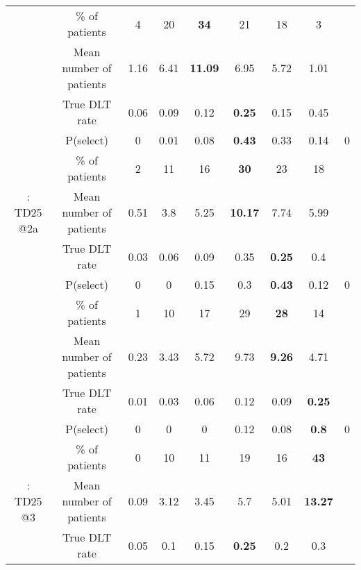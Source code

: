 \begin{table}[h!]
\begin{singlespace}
{\begin{tabular}[t]{ccccccccc}
				\rowcolor{gray!6}   & \% of patients & 4 & 20 & \textbf{34} & 21 & 18 & 3 & \\
				
				\rowcolor{gray!6}  \multirow{-4}{*}{\centering\arraybackslash 11: TD25 @1} & Mean number of patients & 1.16 & 6.41 & \textbf{11.09} & 6.95 & 5.72 & 1.01 & \\
				\cmidrule{1-9}
				& True DLT rate & 0.06 & 0.09 & 0.12 & \textbf{0.25} & 0.15 & 0.45 & \\
				
				& P(select) & 0 & 0.01 & 0.08 & \textbf{0.43} & 0.33 & 0.14 & 0\\
				
				& \% of patients & 2 & 11 & 16 & \textbf{30} & 23 & 18 & \\
				
				\multirow{-4}{*}{\centering\arraybackslash 12: TD25 @2a} & Mean number of patients & 0.51 & 3.8 & 5.25 & \textbf{10.17} & 7.74 & 5.99 & \\
				\cmidrule{1-9}
				\rowcolor{gray!6}   & True DLT rate & 0.03 & 0.06 & 0.09 & 0.35 & \textbf{0.25} & 0.4 & \\
				
				\rowcolor{gray!6}   & P(select) & 0 & 0 & 0.15 & 0.3 & \textbf{0.43} & 0.12 & 0\\
				
				\rowcolor{gray!6}   & \% of patients & 1 & 10 & 17 & 29 & \textbf{28} & 14 & \\
				
				\rowcolor{gray!6}  \multirow{-4}{*}{\centering\arraybackslash 13: TD25 @2b} & Mean number of patients & 0.23 & 3.43 & 5.72 & 9.73 & \textbf{9.26} & 4.71 & \\
				\cmidrule{1-9}
				& True DLT rate & 0.01 & 0.03 & 0.06 & 0.12 & 0.09 & \textbf{0.25} & \\
				
				& P(select) & 0 & 0 & 0 & 0.12 & 0.08 & \textbf{0.8} & 0\\
				
				& \% of patients & 0 & 10 & 11 & 19 & 16 & \textbf{43} & \\
				
				\multirow{-4}{*}{\centering\arraybackslash 14: TD25 @3} & Mean number of patients & 0.09 & 3.12 & 3.45 & 5.7 & 5.01 & \textbf{13.27} & \\
				\cmidrule{1-9}
				\rowcolor{gray!6}   & True DLT rate & 0.05 & 0.1 & 0.15 & \textbf{0.25} & 0.2 & 0.3 & \\
				

\end{tabular}}
\end{singlespace}
\end{table}
